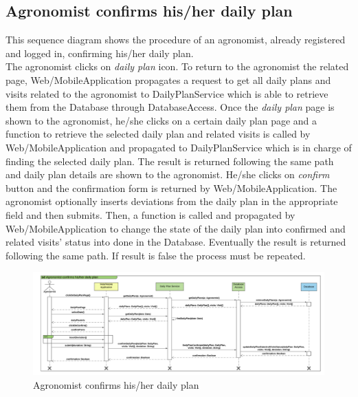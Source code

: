 \subsection{Agronomist confirms his/her daily plan}

This sequence diagram shows the procedure of an agronomist, already registered and logged in, confirming his/her daily plan.\\
The agronomist clicks on \textit{daily plan} icon. To return to the agronomist the related page, Web/MobileApplication propagates a request to get all daily plans and visits related to the agronomist to DailyPlanService which is able to retrieve them from the Database through DatabaseAccess. 
Once the \textit{daily plan} page is shown to the agronomist, he/she clicks on a certain daily plan page and a function to retrieve the selected daily plan and related visits is called by Web/MobileApplication and propagated to DailyPlanService which is in charge of finding the selected daily plan. The result is returned following the same path and daily plan details are shown to the agronomist. He/she clicks on \textit{confirm} button and the confirmation form is returned by Web/MobileApplication. The agronomist optionally inserts deviations from the daily plan in the appropriate field and then submits. Then, a function is called and propagated by Web/MobileApplication to change the state of the daily plan into confirmed and related visits' status into done in the Database. 
Eventually the result is returned following the same path.
If result is false the process must be repeated. 

\newpage
\begin{landscape}
\begin{figure}[t!]
\vspace*{2cm}
\noindent
\centering
\centerline{\includegraphics[scale= 0.108]{./Images/Sequence diagram/Agronomist confirms his_her daily plan.png}}
    \caption{Agronomist confirms his/her daily plan}
    \vspace*{-12cm}
\end{figure}
\fillandplacepagenumber
\end{landscape}

